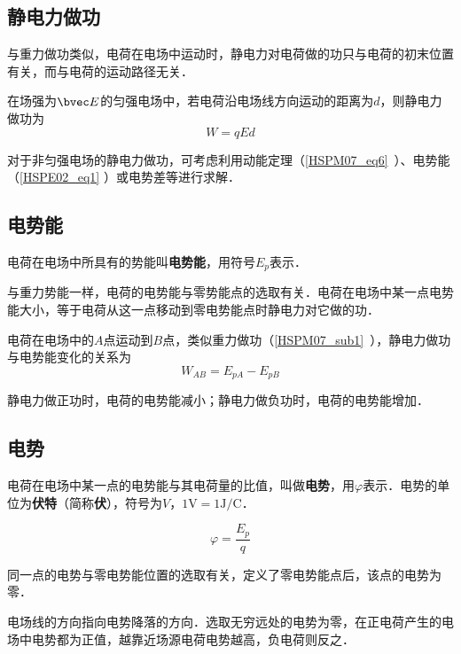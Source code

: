 

\subsection{静电力做功}

与重力做功类似，电荷在电场中运动时，静电力对电荷做的功只与电荷的初末位置有关，而与电荷的运动路径无关．

在场强为$\bvec E$的匀强电场中，若电荷沿电场线方向运动的距离为$d$，则静电力做功为
\begin{equation}
W=qEd
\end{equation}

对于非匀强电场的静电力做功，可考虑利用动能定理（\autoref{HSPM07_eq6}~）、电势能（\autoref{HSPE02_eq1} ）或电势差等进行求解．

\subsection{电势能}

电荷在电场中所具有的势能叫\textbf{电势能}，用符号$E_p$表示．

与重力势能一样，电荷的电势能与零势能点的选取有关．电荷在电场中某一点电势能大小，等于电荷从这一点移动到零电势能点时静电力对它做的功．

电荷在电场中的$A$点运动到$B$点，类似重力做功（\autoref{HSPM07_sub1}~），静电力做功与电势能变化的关系为
\begin{equation}\label{HSPE02_eq1}
W_{AB}=E_{pA}-E_{pB}
\end{equation}

静电力做正功时，电荷的电势能减小；静电力做负功时，电荷的电势能增加．

\subsection{电势}

电荷在电场中某一点的电势能与其电荷量的比值，叫做\textbf{电势}，用$\varphi$表示．电势的单位为\textbf{伏特}（简称\textbf{伏}），符号为$V$，$1\mathrm{V}=1\mathrm{J/C}$．

\begin{equation}
\varphi = \frac{E_p}{q}
\end{equation}

同一点的电势与零电势能位置的选取有关，定义了零电势能点后，该点的电势为零．

电场线的方向指向电势降落的方向．选取无穷远处的电势为零，在正电荷产生的电场中电势都为正值，越靠近场源电荷电势越高，负电荷则反之．
